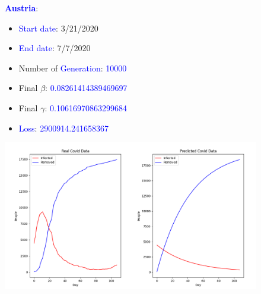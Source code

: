 \documentclass[a4paper]{article}
\begin{document}
    \begin{figure}[ht]
    \centering
    
    \textbf{\textcolor{blue}{Austria}}: 
    \begin{itemize}
        \item \textcolor{blue}{Start date}: 3/21/2020
        \item \textcolor{blue}{End date}: 7/7/2020
        \item Number of \textcolor{blue}{Generation}: \textcolor{blue}{10000}
        \item Final $\beta$: \textcolor{blue}{0.08261414389469697}
        \item Final $\gamma$: \textcolor{blue}{0.10616970863299684}
        \item \textcolor{blue}{Loss}: \textcolor{blue}{2900914.241658367}
    \end{itemize}
    
    \includegraphics[width= \linewidth]{ex5-plot/Austria.png}
    
    \end{figure}
    
\end{document}
